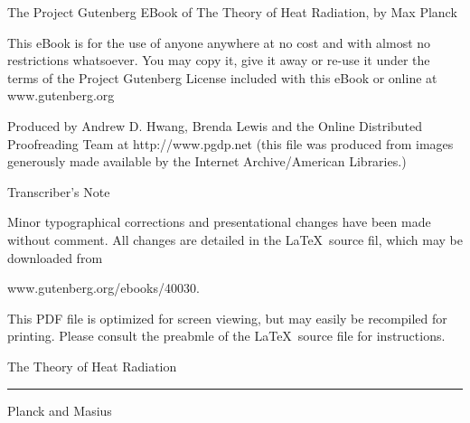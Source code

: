 \documentclass[12pt,oneside]{book}
\begin{document}
\frontmatter

The Project Gutenberg EBook of The Theory of Heat Radiation, by Max Planck \par

This eBook is for the use of anyone anywhere at no cost and with almost no restrictions whatsoever. You may copy it, give it away or re-use it under the terms of the Project
Gutenberg License included with this eBook or online at www.gutenberg.org \par

\pagebreak

Produced by Andrew D. Hwang, Brenda Lewis and the Online Distributed Proofreading Team at http://www.pgdp.net (this file was produced from images generously made available
by the Internet Archive/American Libraries.) \par

\vfill

\begin{center}
    Transcriber's Note
\end{center}
Minor typographical corrections and presentational changes have been made without comment. All changes are detailed in the \LaTeX\ source fil, which may be downloaded from
\begin{center}
    www.gutenberg.org/ebooks/40030. \par
\end{center}
This PDF file is optimized for screen viewing, but may easily be recompiled for printing. Please consult the preabmle of the \LaTeX\ source file for instructions. \par
\begin{titlepage}
    \centering
    \vspace*{6cm}
    {\Huge The Theory of Heat Radiation \par}
    \vspace{12pt}
    \noindent\rule{7cm}{0.4pt} \par
    \vspace{12pt}
    {\huge Planck and Masius} \par
\end{titlepage}

\end{document}
